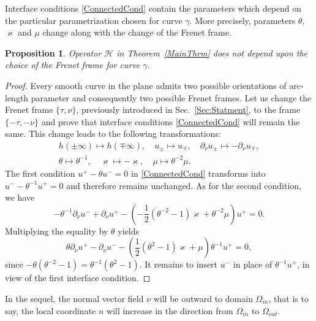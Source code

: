 \documentclass[reqno]{amsart}
\theoremstyle{plain}
\newtheorem{prop}{Proposition}
\numberwithin{equation}{section}
\renewcommand{\kappa}{\varkappa}
\newcommand{\eps}{\varepsilon}
\begin{document}
Interface conditions \eqref{ConnectedCond} contain the parameters which depend on the particular parametrization chosen for curve $\gamma$. More precisely, parameters $\theta$, $\kappa$ and $\mu$ change along with the change of the Frenet frame.

\begin{prop}\label{PropInvarianceOfCnds}
  Operator $\mathcal{H}$ in Theorem~\ref{MainThrm} does not depend upon the choice of the Frenet frame for curve $\gamma$.
\end{prop}
\begin{proof}
Every smooth curve in the plane admits two possible orientations of arc-length parameter and consequently two possible  Frenet frames. Let us change the Frenet frame $\{\tau, \nu\}$, previously introduced in Sec.~\ref{Sec:Statment}, to the frame $\{-\tau, -\nu\}$ and prove that
interface conditions \eqref{ConnectedCond} will remain the same. This change leads to the following transformations:
\begin{gather*}
h(\pm\infty)\mapsto h(\mp\infty), \quad u_\pm\mapsto u_\mp, \quad \partial_\nu u_\pm \mapsto -\partial_\nu u_\mp,\\
\theta\mapsto \theta^{-1}, \quad \kappa\mapsto -\kappa,\quad \mu\mapsto \theta^{-2}\mu.
\end{gather*}
The first condition $u^+-\theta u^-=0$ in \eqref{ConnectedCond} transforms into $u^--\theta^{-1} u^+=0$ and therefore remains unchanged. As for the second condition, we have
\begin{equation*}
 	-\theta^{-1}\partial_\nu u^-+\partial_\nu u^+
	-\left(-\textstyle\frac{1}{2}(\theta^{-2}-1)\kappa
	+\theta^{-2}\mu\right) u^+=0.
\end{equation*}
Multiplying the equality by $\theta$  yields
\begin{equation*}
	\theta\partial_\nu u^+-\partial_\nu u^-
	-\left(\textstyle\frac{1}{2 }(\theta^{2}-1)\kappa+\mu\right) 	\theta^{-1} u^+=0,
\end{equation*}
since $-\theta(\theta^{-2}-1)=\theta^{-1}(\theta^{2}-1)$. It remains to insert $u^-$ in place of $\theta^{-1} u^+$, in view of the first interface condition.
\end{proof}

In the sequel, the normal vector field $\nu$ will be outward to domain $\Omega_{in}$, that is to say, the local coordinate $n$ will increase in the direction from $\Omega_{in}$ to $\Omega_{out}$.



%
\end{document}
